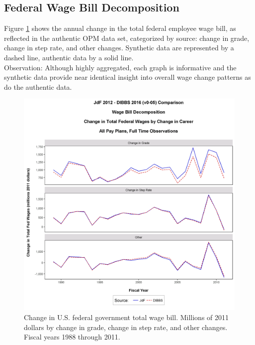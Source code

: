 \documentclass[10pt, letterpaper]{article}
\begin{document}
\begin{spacing}{1.0}
\subsection{Federal Wage Bill Decomposition}

Figure \ref{figure:WageChangePromotionVsFYAllPayPlans} shows the annual change in the total federal employee wage bill, as reflected in the authentic OPM data set, categorized by source:  change in grade, change in step rate, and other changes.  Synthetic data are represented by a dashed line, authentic data by a solid line.\\

Observation:  Although highly aggregated, each graph is informative and the synthetic data provide near identical insight into overall wage change patterns as do the authentic data.\\

\vspace{20pt}

\begin{figure}[h]
    \centering
    \includegraphics[width=6in, trim={0 0.6in 0 1.5in}, clip]{WageChangePromotionVsFYAllPayPlans.png}
    \caption{Change in U.S. federal government total wage bill.  Millions of 2011 dollars by change in grade, change in step rate, and other changes.  Fiscal years 1988 through 2011. }
    \label{figure:WageChangePromotionVsFYAllPayPlans}
\end{figure}


\end{spacing}
\end{document}
